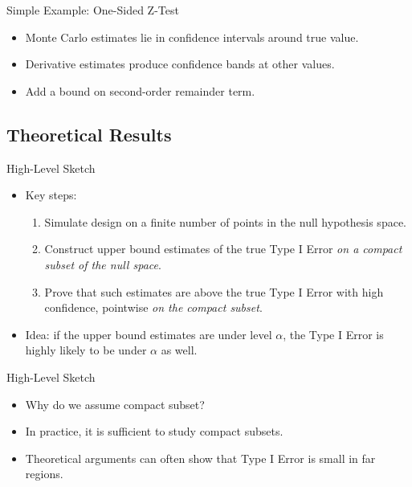 \begin{frame}{Simple Example: One-Sided Z-Test}
\begin{figure}
\begin{subfigure}[b]{0.49\textwidth}
\end{subfigure}
\end{figure}
\begin{itemize}
    \item Monte Carlo estimates lie in confidence intervals around true value.
    \item Derivative estimates produce confidence bands at other values.
    \item Add a bound on second-order remainder term. 
\end{itemize}
\end{frame}

\subsection{Theoretical Results}

\begin{frame}{High-Level Sketch}
\begin{itemize}
    \item Key steps:
    \begin{enumerate}
    \item Simulate design on a finite number of points
    in the null hypothesis space.
    \item Construct upper bound estimates of the true Type I Error
    \emph{on a compact subset of the null space}.
    \item Prove that such estimates are above the true Type I Error
    with high confidence, pointwise \emph{on the compact subset}.
    \end{enumerate}
    
    \item Idea: if the upper bound estimates are under level $\alpha$,
    the Type I Error is highly likely to be under $\alpha$ as well.
\end{itemize}
\end{frame}

\begin{frame}{High-Level Sketch}
\begin{itemize}
    \item Why do we assume compact subset? 
    \item In practice, it is sufficient to study compact subsets.
    \item Theoretical arguments can often show that Type I Error is small in far regions.
\end{itemize}
\end{frame}

